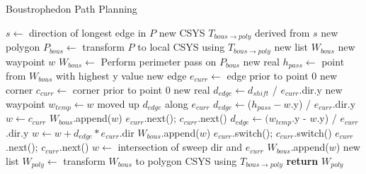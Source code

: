 \begin{algorithm}[htb]
\caption{Boustrophedon Path Planning}\label{alg:boustrophedon}
\begin{algorithmic}[1]
		\State $s \leftarrow$ direction of longest edge in $P$
	\EndIf
	\State new CSYS $T_{bous\rightarrow poly}$ derived from $s$
	\State new polygon $P_{bous} \leftarrow$ transform $P$ to local CSYS using $T_{bous\rightarrow poly}$
	\State new list $W_{bous}$ 
	\State new waypoint $w$
	\State $W_{bous} \leftarrow$ Perform perimeter pass on $P_{bous}$
	\State new real $h_{pass} \leftarrow$ point from $W_{bous}$ with highest y value
	\State new edge $e_{curr} \leftarrow$ edge prior to point 0
	\State new corner $c_{curr} \leftarrow$ corner prior to point 0
		\State new real $d_{edge} \leftarrow d_{shift}$ / $e_{curr}$.dir.y
		\State new waypoint $w_{temp} \leftarrow w$ moved up $d_{edge}$ along $e_{curr}$
			\State $d_{edge} \leftarrow $($h_{pass} - w$.y) / $e_{curr}$.dir.y
			\State $w \leftarrow c_{curr}$
			\State $W_{bous}$.append($w$)
			\State $e_{curr}$.next(); $c_{curr}$.next()
			\State $d_{edge} \leftarrow (w_{temp}$.y - $w$.y) / $e_{curr}$.dir.y
		\EndIf
		\State $w \leftarrow w + d_{edge} * e_{curr}$.dir
		\State $W_{bous}$.append($w$)
		\State $e_{curr}$.switch(); $c_{curr}$.switch()
			\State $e_{curr}$.next(); $c_{curr}$.next()
		\EndIf
		\State $w \leftarrow$ intersection of sweep dir and $e_{curr}$
		\State $W_{bous}$.append($w$)
	\EndWhile
	\State new list $W_{poly} \leftarrow$ transform $W_{bous}$ to polygon CSYS using $T_{bous\rightarrow poly}$
	\State \textbf{return} $W_{poly}$
\EndFunction
\end{algorithmic}
\end{algorithm}

